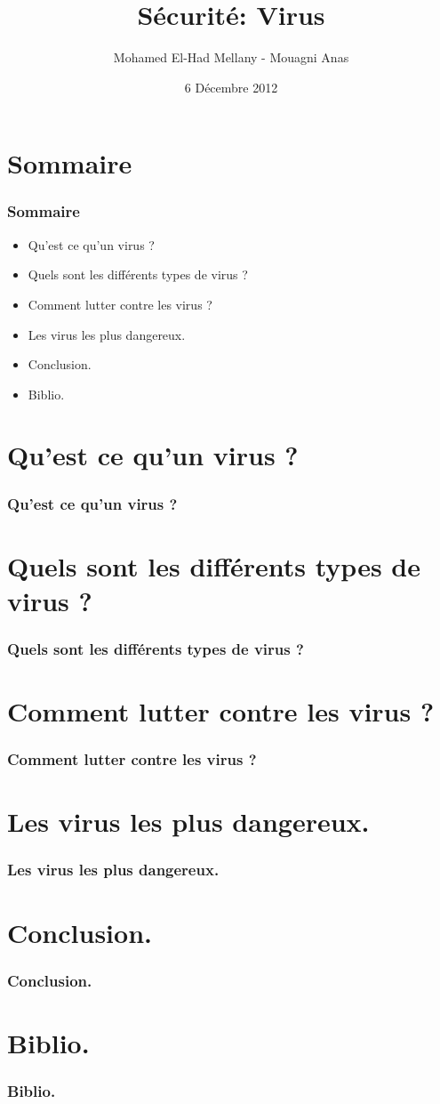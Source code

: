 \documentclass{beamer}
\title{Sécurité: Virus}
\author{Mohamed El-Had Mellany - Mouagni Anas}
\institute{UM2}
\date{6 Décembre 2012}
\begin{document}
\begin{frame}
	\titlepage
\end{frame}

\section*{Sommaire}
\begin{frame}
	\frametitle{Sommaire}
	\begin{itemize}
		\pause\item Qu'est ce qu'un virus ?
		\pause\item Quels sont les différents types de virus ?
		\pause\item Comment lutter contre les virus ?
		\pause\item Les virus les plus dangereux.
		\pause\item Conclusion.
		\pause\item Biblio.
	\end{itemize}
\end{frame}


\section*{Qu'est ce qu'un virus ?}
\begin{frame}
	\frametitle{Qu'est ce qu'un virus ?}
\end{frame}


\section*{Quels sont les différents types de virus ?}
\begin{frame}
	\frametitle{Quels sont les différents types de virus ?}
\end{frame}


\section*{Comment lutter contre les virus ?}
\begin{frame}
	\frametitle{Comment lutter contre les virus ?}
\end{frame}


\section*{Les virus les plus dangereux.}
\begin{frame}
	\frametitle{Les virus les plus dangereux.}
\end{frame}


\section*{Conclusion.}
\begin{frame}
	\frametitle{Conclusion.}
\end{frame}


\section*{Biblio.}
\begin{frame}
	\frametitle{Biblio.}
\end{frame}
\end{document}
